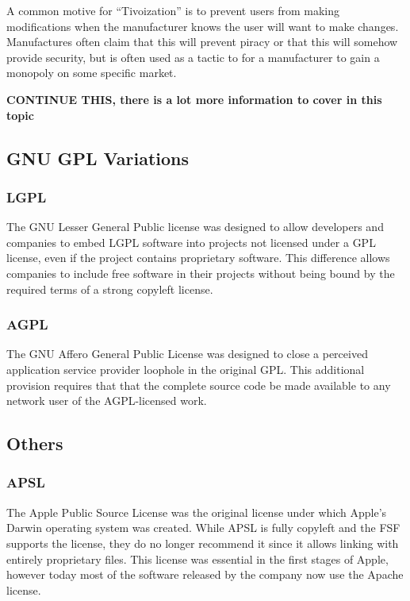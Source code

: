 \documentclass[12pt,letterpaper]{article}
\begin{document}
A common motive for ``Tivoization'' is to prevent users from making modifications when the manufacturer knows the user will want to make changes. Manufactures often claim that this will prevent piracy or that this will somehow provide security, but is often used as a tactic to for a manufacturer to gain a monopoly on some specific market.

\textbf{CONTINUE THIS, there is a lot more information to cover in this topic}

\subsection{GNU GPL Variations}

\subsubsection{LGPL}

The GNU Lesser General Public license was designed to allow developers and companies to embed LGPL software into projects not licensed under a GPL license, even if the project contains proprietary software. This difference allows companies to include free software in their projects without being bound by the required terms of a strong copyleft license.

\subsubsection{AGPL}

The GNU Affero General Public License was designed to close a perceived application service provider loophole in the original GPL. This additional provision requires that  that the complete source code be made available to any network user of the AGPL-licensed work.

\subsection{Others}

\subsubsection{APSL}

The Apple Public Source License was the original license under which Apple's Darwin operating system was created. While APSL is fully copyleft and the FSF supports the license, they do no longer recommend it since it allows linking with entirely proprietary files. This license was essential in the first stages of Apple, however today most of the software released by the company now use the Apache license.
\end{document}
